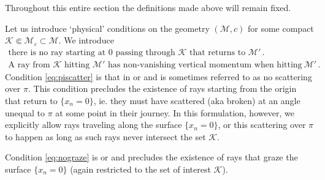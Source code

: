 \documentclass[
	fontsize=11pt, 
	twoside=false, 
	abstract=true, 
	a4paper,
]{scrartcl}
\newcommand{\eps}{\varepsilon}
\begin{document}
Throughout this entire section the definitions made above will remain fixed. 

Let us introduce `physical' conditions on the geometry $(\mathcal{M},c)$ for some compact $\mathcal{K}\Subset\mathcal{M}_\eps\subset \mathcal{M}$.
We introduce
\begin{gather}\label{eq:piscatter}
	\text{there is no ray starting at $0$ passing through $\mathcal{K}$ that returns to $\mathcal{M}'$}\,.\tag{A1}\\
	\text{A ray from $\mathcal{K}$ hitting $\mathcal{M}'$ has non-vanishing vertical momentum when hitting}\ \mathcal{M}'\,.\tag{A2}\label{eq:nograze}
\end{gather}
Condition \cref{eq:piscatter} is that in \cite[Assumption~(iii)]{zbMATH04097945} or \cite[Thm.~2.4~(2.)]{zbMATH01725533} and is sometimes referred to as no scattering over $\pi$. This condition precludes the existence of rays starting from the origin that return to $\{x_n=0\}$, ie. they must have scattered (aka broken) at an angle unequal to $\pi$ at some point in their journey. In this formulation, however, we explicitly allow rays traveling along the surface $\{x_n=0\}$, or this scattering over $\pi$ to happen as long as such rays never intersect the set $\mathcal{K}$.

Condition \cref{eq:nograze} is \cite[Assumption~(i)]{zbMATH04097945} or \cite[Thm.~2.4~(1.)]{zbMATH01725533} and precludes the existence of rays that graze the surface $\{x_n=0\}$ (again restricted to the set of interest $\mathcal{K}$).
\end{document}
